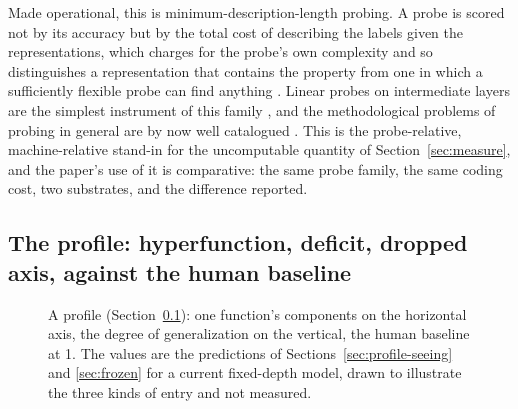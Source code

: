 Made operational, this is minimum-description-length probing. A probe is scored not by its accuracy but
by the total cost of describing the labels given the representations, which charges for the probe's own
complexity and so distinguishes a representation that contains the property from one in which a
sufficiently flexible probe can find anything \citep{voita2020}. Linear probes on intermediate layers
are the simplest instrument of this family \citep{alain2016}, and the methodological problems of probing
in general are by now well catalogued \citep{belinkov2022}. This is the probe-relative, machine-relative
stand-in for the uncomputable quantity of Section~\ref{sec:measure}, and the paper's use of it is
comparative: the same probe family, the same coding cost, two substrates, and the difference reported.

\subsection{The profile: hyperfunction, deficit, dropped axis, against the human baseline}
\label{sec:profile}

\begin{figure}[t]
\centering
{}
\caption{A profile (Section~\ref{sec:profile}): one function's components on the horizontal axis, the
degree of generalization on the vertical, the human baseline at 1. The values are the predictions of
Sections~\ref{sec:profile-seeing} and \ref{sec:frozen} for a current fixed-depth model, drawn to
illustrate the three kinds of entry and not measured.}
\label{fig:profile}
\end{figure}

